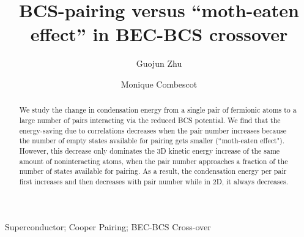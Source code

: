 \documentclass[5p,twocolumn]{elsarticle}
\begin{document}
\title{ BCS-pairing versus ``moth-eaten effect'' in BEC-BCS crossover}
\author[uiuc]{Guojun Zhu}
\author[uiuc,upmc]{Monique Combescot}

\address[uiuc]{Department of Physics, University of Illinois at Urbana-Champaign, 1110 W Green St, Urbana, IL, 61801}

\address[upmc]{Institut des NanoSciences de Paris, Universite Pierre et Marie Curie, CNRS, Tour 22, 4 place Jussieu, 75005 Paris }
\newcommand{\vk}{\ensuremath{\mathbf{k}}}
\providecommand{\vr}{\ensuremath{\mathbf{r}}}
\newcommand{\vp}{\ensuremath{\mathbf{p}}}


\providecommand{\comm}[1]{\textit{\scriptsize \uwave{(#1)}}}
\newcommand{\td}{{\ensuremath{{\text{(2D)}}}}}
\newcommand{\sd}{{\ensuremath{{\text{(3D)}}}}}
\newcommand{\Arctg}{\ensuremath{\text{Arctg}}}



\begin{abstract}
We study the change in condensation energy from a single pair of fermionic atoms to a large number of pairs interacting via the reduced BCS potential. We find that the energy-saving due to correlations decreases when the pair number increases because the number of empty states available for pairing gets smaller (``moth-eaten effect"). However, this decrease only dominates the 3D kinetic energy increase of the same amount of noninteracting atoms, when the pair number approaches a fraction of the number of states available for pairing. As a result, the condensation energy per pair first increases and then decreases with pair number while in 2D, it always decreases.  
\end{abstract}
\begin{keyword}
Superconductor; Cooper Pairing; BEC-BCS Cross-over
\end{keyword}

\maketitle
\end{document}

